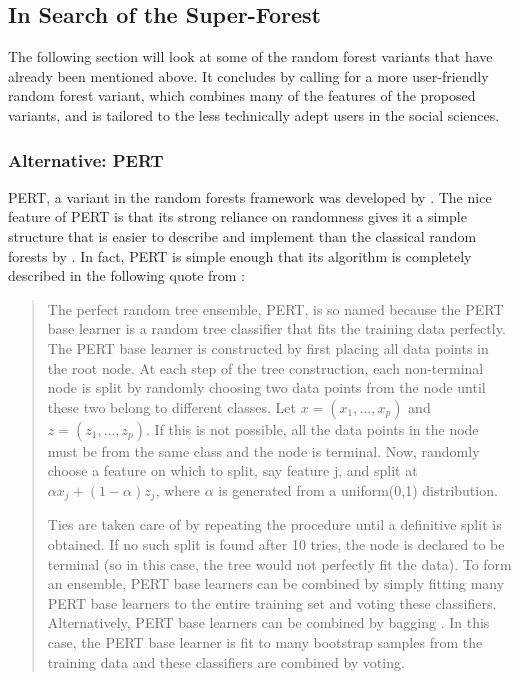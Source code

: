 \documentclass[a4paper,man,12pt,apacite,floatsintext,draftfirst]{apa6} %
\begin{document}
\subsection{In Search of the Super-Forest}
The following section will look at some of the random forest variants that
have already been mentioned above. It concludes by calling for a more
user-friendly random forest variant, which combines many of the features of
the proposed variants, and is tailored to the less technically adept users
in the social sciences.

\subsubsection{Alternative: PERT}
PERT, a variant in the random forests framework was developed
by .
The nice feature of PERT is that its strong reliance on randomness gives
it a simple structure that is easier to describe and implement than the
classical random forests by .
In fact, PERT is simple enough that its algorithm is completely described
in the following quote from :

\begin{quotation}
The perfect random tree ensemble, PERT, is so named because the PERT base
learner is a random tree classifier that fits the training data perfectly.
The PERT base learner is constructed by first placing all data points in
the root node.
At each step of the tree construction, each non-terminal node is split by
randomly choosing two data points from the node until these two belong to
different classes.
Let \( x = (x_{1} , . . . , x_{p} ) \) and \( z = (z_{1} , . . . , z_{p} ) \).
If this is not possible, all the data points in the node must be from the
same class and the node is terminal.
Now, randomly choose a feature on which to split, say feature j, and split
at \( \alpha x_{j} + (1 - \alpha) z_{j} \), where \( \alpha \) is generated
from a uniform(0,1) distribution.

Ties are taken care of by repeating the procedure until a definitive
split is obtained.
If no such split is found after 10 tries, the node is declared to be
terminal (so in this case, the tree would not perfectly fit the data).
To form an ensemble, PERT base learners can be combined by simply fitting
many PERT base learners to the entire training set and voting these
classifiers.
Alternatively, PERT base learners can be combined by bagging
\cite{breiman1996bagging}.
In this case, the PERT base learner is fit to many bootstrap samples
from the training data and these classifiers are combined by voting.
\end{quotation}
\end{document}
